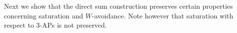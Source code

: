 \documentclass[11pt]{article}
\numberwithin{table}{section}
\newcommand{\F}{{\mathbb F}}
\newcommand{\sat}{\mathrm{sat}}
\newtheorem{remark}[theorem]{Remark}
\newtheorem{cor}[theorem]{\bf Corollary}
\newtheorem{prop}[theorem]{\bf Proposition}
\theoremstyle{definition}
\begin{document}
	
	
	
	\noindent Next we show that the direct sum construction preserves certain properties concerning saturation and $W$-avoidance. Note however that saturation with respect to $3$-$\mathrm{AP}$s is not preserved.
	
\end{document}
